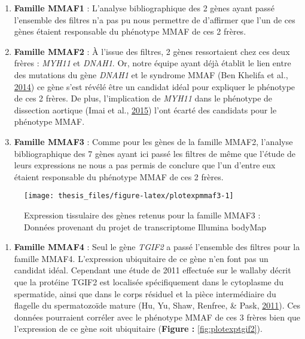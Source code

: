 \documentclass[12pt,twoside]{reedthesis}
\providecommand{\tightlist}{%
  \setlength{\itemsep}{0pt}\setlength{\parskip}{0pt}}
\theoremstyle{definition}
\theoremstyle{definition}
\theoremstyle{remark}
\begin{document}
  \begin{enumerate}
  \def\labelenumi{\arabic{enumi}.}
  \setcounter{enumi}{2}
  \tightlist
  \item
    \textbf{Famille MMAF1} : L'analyse bibliographique des 2 gènes ayant
    passé l'ensemble des filtres n'a pas pu nous permettre de d'affirmer
    que l'un de ces gènes étaient responsable du phénotype MMAF de ces 2
    frères.\\
  \item
    \textbf{Famille MMAF2} : À l'issue des filtres, 2 gènes ressortaient
    chez ces deux frères : \emph{MYH11} et \emph{DNAH1}. Or, notre équipe
    ayant déjà établit le lien entre des mutations du gène \emph{DNAH1} et
    le syndrome MMAF (Ben Khelifa et al.,
    \protect\hyperlink{ref-BenKhelifa2014}{2014}) ce gène s'est révélé
    être un candidat idéal pour expliquer le phénotype de ces 2 frères. De
    plus, l'implication de \emph{MYH11} dans le phénotype de dissection
    aortique (Imai et al., \protect\hyperlink{ref-Imai2015}{2015}) l'ont
    écarté des candidats pour le phénotype MMAF.\\
  \item
    \textbf{Famille MMAF3} : Comme pour les gènes de la famille MMAF2,
    l'analyse bibliographique des 7 gènes ayant ici passé les filtres de
    même que l'étude de leurs expressions ne nous a pas permis de conclure
    que l'un d'entre eux étaient responsable du phénotype MMAF de ces 2
    frères.
  \end{enumerate}
  
  \begin{figure}
  
  {\centering \texttt{[image: thesis\_files/figure-latex/plotexpmmaf3-1]} 
  
  }
  
  \caption[Expression tissulaire des gènes retenus pour la famille MMAF3]{Expression tissulaire des gènes retenus pour la famille MMAF3 : Données provenant du projet de transcriptome Illumina bodyMap}\label{fig:plotexpmmaf3}
  \end{figure}
  
  \begin{enumerate}
  \def\labelenumi{\arabic{enumi}.}
  \setcounter{enumi}{5}
  \tightlist
  \item
    \textbf{Famille MMAF4} : Seul le gène \emph{TGIF2} a passé l'ensemble
    des filtres pour la famille MMAF4. L'expression ubiquitaire de ce gène
    n'en font pas un candidat idéal. Cependant une étude de 2011 effectuée
    sur le wallaby décrit que la protéine TGIF2 est localisée
    spécifiquement dans le cytoplasme du spermatide, ainsi que dans le
    corps résiduel et la pièce intermédiaire du flagelle du spermatozoïde
    mature (Hu, Yu, Shaw, Renfree, \& Pask,
    \protect\hyperlink{ref-Hu2011}{2011}). Ces données pourraient corréler
    avec le phénotype MMAF de ces 3 frères bien que l'expression de ce
    gène soit ubiquitaire (\textbf{Figure : }\ref{fig:plotexptgif2}).
  \end{enumerate}
  
\end{document}
